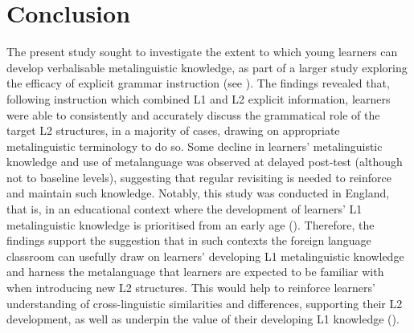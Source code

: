 \documentclass[output=paper]{langscibook}
\begin{document}
\section{Conclusion} 

The present study sought to investigate the extent to which young learners can develop verbalisable metalinguistic knowledge, as part of a larger study exploring the efficacy of explicit grammar instruction (see \citealt{Hanan2015,KasprowiczMarsden2018}). The findings revealed that, following instruction which combined L1 and L2 explicit information, learners were able to consistently and accurately discuss the grammatical role of the target L2 structures, in a majority of cases, drawing on appropriate metalinguistic terminology to do so. Some decline in learners’ metalinguistic knowledge and use of metalanguage was observed at delayed post-test (although not to baseline levels), suggesting that regular revisiting is needed to reinforce and maintain such knowledge. Notably, this study was conducted in England, that is, in an educational context where the development of learners’ L1 metalinguistic knowledge is prioritised from an early age (\citealt{DfE2013curriculum}). Therefore, the findings support the suggestion that in such contexts the foreign language classroom can usefully draw on learners’ developing L1 metalinguistic knowledge and harness the metalanguage that learners are expected to be familiar with when introducing new L2 structures. This would help to reinforce learners’ understanding of cross-linguistic similarities and differences, supporting their L2 development, as well as underpin the value of their developing L1 knowledge (\citealt{BellEtAl2020}).

\printbibliography[heading=subbibliography,notkeyword=this]
\end{document}
